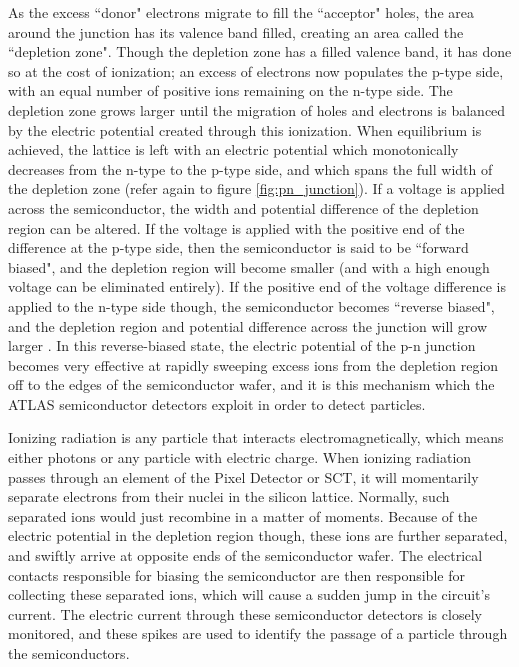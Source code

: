         As the excess ``donor" electrons migrate to fill the ``acceptor" holes, the area around the junction has its valence band filled, creating an area called the ``depletion zone".
        Though the depletion zone has a filled valence band, it has done so at the cost of ionization; an excess of electrons now populates the p-type side, with an equal number of positive ions remaining on the n-type side.
        The depletion zone grows larger until the migration of holes and electrons is balanced by the electric potential created through this ionization.
        When equilibrium is achieved, the lattice is left with an electric potential which monotonically decreases from the n-type to the p-type side, and which spans the full width of the depletion zone (refer again to figure \ref{fig:pn_junction}).
        If a voltage is applied across the semiconductor, the width and potential difference of the depletion region can be altered.
        If the voltage is applied with the positive end of the difference at the p-type side, then the semiconductor is said to be ``forward biased", and the depletion region will become smaller (and with a high enough voltage can be eliminated entirely).
        If the positive end of the voltage difference is applied to the n-type side though, the semiconductor becomes ``reverse biased", and the depletion region and potential difference across the junction will grow larger \cite{wiley_radiation_detection}.
        In this reverse-biased state, the electric potential of the p-n junction becomes very effective at rapidly sweeping excess ions from the depletion region off to the edges of the semiconductor wafer, and it is this mechanism which the ATLAS semiconductor detectors exploit in order to detect particles.

        Ionizing radiation is any particle that interacts electromagnetically, which means either photons or any particle with electric charge.
        When ionizing radiation passes through an element of the Pixel Detector or SCT, it will momentarily separate electrons from their nuclei in the silicon lattice.
        Normally, such separated ions would just recombine in a matter of moments.
        Because of the electric potential in the depletion region though, these ions are further separated, and swiftly arrive at opposite ends of the semiconductor wafer.
        The electrical contacts responsible for biasing the semiconductor are then responsible for collecting these separated ions, which will cause a sudden jump in the circuit's current.
        The electric current through these semiconductor detectors is closely monitored, and these spikes are used to identify the passage of a particle through the semiconductors.

